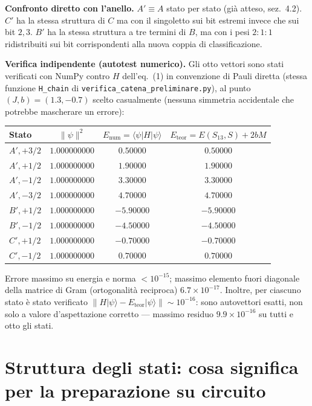 \documentclass[11pt,a4paper]{article}
\begin{document}
\textbf{Confronto diretto con l'anello.} $A'\equiv A$ stato per stato (già
atteso, sez.~4.2). $C'$ ha la stessa struttura di $C$ ma con il singoletto
sui bit estremi invece che sui bit $2,3$. $B'$ ha la stessa struttura a tre
termini di $B$, ma con i pesi $2{:}1{:}1$ ridistribuiti sui bit
corrispondenti alla nuova coppia di classificazione.

\begin{sloppypar}
\textbf{Verifica indipendente (autotest numerico).} Gli otto vettori sono
stati verificati con NumPy contro $H$ dell'eq.~(1) in convenzione di Pauli
diretta (stessa funzione \texttt{H\_\allowbreak chain} di
\texttt{verifica\_\allowbreak catena\_\allowbreak preliminare.py}), al punto
$(J,b)=(1.3,-0.7)$ scelto casualmente (nessuna simmetria accidentale che
potrebbe mascherare un errore):
\end{sloppypar}

\begin{table}[h]
\centering
\begin{tabular}{@{}lccc@{}}
\toprule
Stato & $\|\psi\|^2$ & $E_{\text{num}}=\langle\psi|H|\psi\rangle$ & $E_{\text{teor}}=E(S_{13},S)+2bM$\\
\midrule
$A',{+}3/2$ & $1.000000000$ & $0.50000$ & $0.50000$\\
$A',{+}1/2$ & $1.000000000$ & $1.90000$ & $1.90000$\\
$A',{-}1/2$ & $1.000000000$ & $3.30000$ & $3.30000$\\
$A',{-}3/2$ & $1.000000000$ & $4.70000$ & $4.70000$\\
$B',{+}1/2$ & $1.000000000$ & $-5.90000$ & $-5.90000$\\
$B',{-}1/2$ & $1.000000000$ & $-4.50000$ & $-4.50000$\\
$C',{+}1/2$ & $1.000000000$ & $-0.70000$ & $-0.70000$\\
$C',{-}1/2$ & $1.000000000$ & $0.70000$ & $0.70000$\\
\bottomrule
\end{tabular}
\end{table}

Errore massimo su energia e norma $<10^{-15}$; massimo elemento fuori
diagonale della matrice di Gram (ortogonalità reciproca) $6.7\times10^{-17}$.
Inoltre, per ciascuno stato è stato verificato $\|H|\psi\rangle-E_{\text{teor}}|\psi\rangle\|\sim10^{-16}$:
sono autovettori esatti, non solo a valore d'aspettazione corretto —
massimo residuo $9.9\times10^{-16}$ su tutti e otto gli stati.

\section{Struttura degli stati: cosa significa per la preparazione su circuito}
\end{document}
